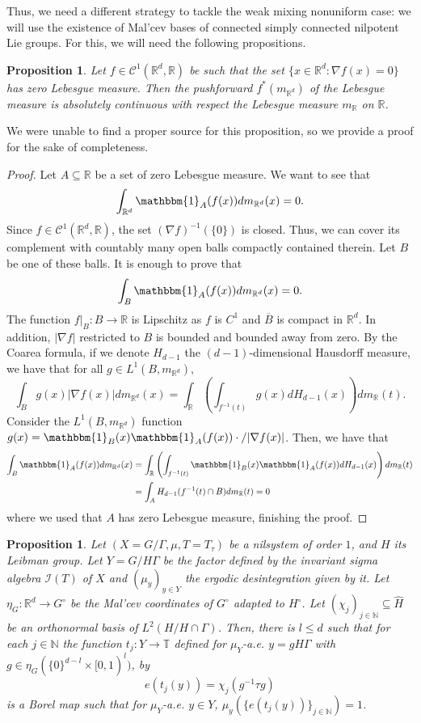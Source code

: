\documentclass[letter, 11pt]{article}
\newtheorem{proposition}[theorem]{Proposition}
\theoremstyle{definition}
\theoremstyle{plain}
\newcommand{\N}{\mathbb{N}}
\newcommand{\R}{\mathbb{R}}
\newcommand{\T}{\mathbb{T}}
\newcommand{\ind}[1]{\mathbbm{1}_{#1}}
\newcommand{\1}{\mathbbm{1}}
\begin{document}
Thus, we need a different strategy to tackle the weak mixing nonuniform case: we will use the existence of Mal'cev bases of connected simply connected nilpotent Lie groups. For this, we will need the following propositions. 
\begin{proposition}\label{app-coarea-formula}
    Let $f\in \mathcal{C}^1(\R^d,\R)$ be such that the set $\{x\in \R^d : \nabla f (x)=0\}$ has zero Lebesgue measure. Then the pushforward $f^*(m_{\R^d})$ of the Lebesgue measure is absolutely continuous with respect the Lebesgue measure $m_{\R}$ on $\R$.
\end{proposition}
We were unable to find a proper source for this proposition, so we provide a proof for the sake of completeness. 
\begin{proof}
    Let $A\subseteq \R$ be a set of zero Lebesgue measure. We want to see that 
    $$\int_{\R^d} \ind{ A}(f(x)) dm_{\R^d}(x)=0. $$
    Since $f\in \mathcal{C}^1(\R^d,\R)$, the set  $(\nabla f)^{-1}(\{0\})$ is closed. Thus, we can cover its complement with countably many open balls compactly contained therein. Let $B$ be one of these balls. It is enough to prove that 
    $$ \int_B \ind{A}(f(x)) dm_{\R^d}(x)=0.$$
    The function $f|_B: B \to \R$ is Lipschitz as $f$ is $C^1$ and $\overline{B}$ is compact in $\R^d$. In addition, $|\nabla f|$ restricted to $B$ is bounded and bounded away from zero. By the Coarea formula, if we denote $H_{d-1}$ the $(d-1)$-dimensional Hausdorff measure, we have that for all $g\in L^1(B,m_{\R^d})$,
    $$\int_B g(x) |\nabla f(x)| dm_{\R^d}(x) = \int_{\R} \left( \int_{f^{-1}(t)} g(x) d H_{d-1}(x) \right) dm_{\R}(t).  $$
    Consider the $L^1(B,m_{\R^d})$ function $g(x)= \ind{B}(x) \ind{A}(f(x)) \cdot /|\nabla f (x)|$. Then, we have that 
    \begin{align*}
      \int_B \ind{A}(f(x)) dm_{\R^d}(x)&= \int_{\R} \left( \int_{f^{-1}(t)} \ind{B}(x) \ind{A}(f(x)) dH_{d-1} (x) \right) dm_{\R}(t)\\
      &=  \int_{A}  H_{d-1}(f^{-1}(t) \cap B) dm_{\R}(t)=0
    \end{align*}
where we used that $A$ has zero Lebesgue measure, finishing the proof. 
\end{proof}
\begin{proposition}\label{tj-explicit}
    Let $(X=G/\Gamma,\mu,T=T_\tau)$ be a nilsystem of order $1$, and $H$ its Leibman group. Let $Y=G/H\Gamma$ be the factor defined by the invariant sigma algebra $\mathcal{I}(T)$ of $X$ and $(\mu_y)_{y\in Y}$ the ergodic desintegration given by it. Let $\eta_{G}: \R^d \to G^\circ$ be the Mal'cev coordinates of $G^\circ$ adapted to $H^\circ$. Let $(\chi_j)_{j\in \N}\subseteq \widehat{H}$ be an orthonormal basis of $L^2(H/H\cap \Gamma)$. Then, there is $l\leq d$ such that for each $j\in \N$ the function $t_j:Y\to \T$ defined for $\mu_Y$-a.e. $y=gH\Gamma$ with $g\in \eta_G(\{0\}^{d-l}\times [0,1)^l)$, by $$e(t_j(y))= \chi_j(g^{-1}\tau g)$$
    is a Borel map such that  for $\mu_Y$-a.e. $y\in Y$, $\mu_y(\{e(t_j(y))\}_{j\in \N})=1$. 
\end{proposition}
\end{document}
